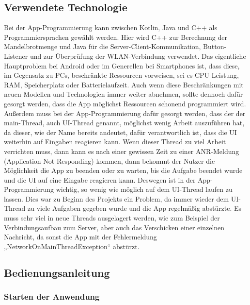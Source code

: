 \documentclass[12pt, onecolumn,notitlepage]{scrartcl}
\begin{document}
\subsection{Verwendete Technologie}
Bei der App-Programmierung kann zwischen Kotlin, Java und C++ als Programmiersprachen gewählt werden. Hier wird C++ zur Berechnung der Mandelbrotmenge und Java für die Server-Client-Kommunikation, Button-Listener und zur Überprüfung der WLAN-Verbindung verwendet. Das eigentliche Hauptproblem bei Android oder im Generellen bei Smartphones ist, dass diese, im Gegensatz zu PCs, beschränkte Ressourcen vorweisen, sei es CPU-Leistung, RAM, Speicherplatz oder Batterielaufzeit. Auch wenn diese Beschränkungen mit neuen Modellen und Technologien immer weiter abnehmen, sollte dennoch dafür gesorgt werden, dass die App möglichst Ressourcen schonend programmiert wird. Außerdem muss bei der App-Programmierung dafür gesorgt werden, dass der der main-Thread, auch UI-Thread genannt, möglichst wenig Arbeit auszuführen hat, da dieser, wie der Name bereits andeutet, dafür verantwortlich ist, dass die UI weiterhin auf Eingaben reagieren kann. Wenn dieser Thread zu viel Arbeit verrichten muss, dann kann es nach einer gewissen Zeit zu einer ANR-Meldung (Application Not Responding) kommen, dann bekommt der Nutzer die Möglichkeit die App zu beenden oder zu warten, bis die Aufgabe beendet wurde und die UI auf eine Eingabe reagieren kann. Deswegen ist in der App-Programmierung wichtig, so wenig wie möglich auf dem UI-Thread laufen zu lassen. Dies war zu Beginn des Projekts ein Problem, da immer wieder dem UI-Thread zu viele Aufgaben gegeben wurde und die App regelmäßig abstürzte. Es muss sehr viel in neue Threads ausgelagert werden, wie zum Beispiel der Verbindungsaufbau zum Server, aber auch das Verschicken einer einzelnen Nachricht, da sonst die App mit der Fehlermeldung „NetworkOnMainThreadException“ abstürzt.
\subsection{Bedienungsanleitung}
\subsubsection{Starten der Anwendung}
\end{document}
